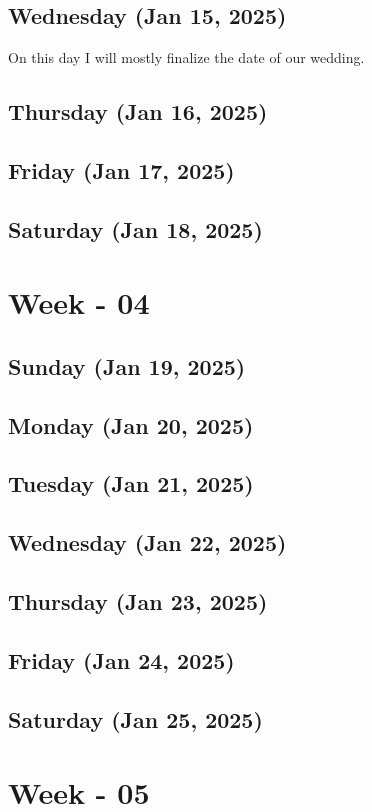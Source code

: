 \subsection*{Wednesday (Jan 15, 2025)}
\hspace{1cm}On this day I will mostly finalize the date of our wedding. 
\subsection*{Thursday (Jan 16, 2025)}
\subsection*{Friday (Jan 17, 2025)}
\subsection*{Saturday (Jan 18, 2025)}

\section{Week - 04}
\subsection*{Sunday (Jan 19, 2025)}
\subsection*{Monday (Jan 20, 2025)}
\subsection*{Tuesday (Jan 21, 2025)}
\subsection*{Wednesday (Jan 22, 2025)}
\subsection*{Thursday (Jan 23, 2025)}
\subsection*{Friday (Jan 24, 2025)}
\subsection*{Saturday (Jan 25, 2025)}

\section{Week - 05}

